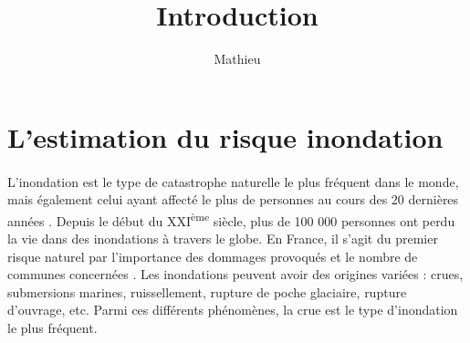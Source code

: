 \documentclass[11pt]{article}
\title{Introduction}
\author{Mathieu}
\begin{document}
\maketitle

\tableofcontents

\newpage

\section{L'estimation du risque inondation}

	\paragraph{} L'inondation est le type de catastrophe naturelle le plus fréquent dans le monde, mais également celui ayant affecté le plus de personnes au cours des 20 dernières années \citep{undrr_human_2020}. Depuis le début du XXI\textsuperscript{ème} siècle, plus de 100 000 personnes ont perdu la vie dans des inondations à travers le globe. En France, il s'agit du premier risque naturel par l'importance des dommages provoqués et le nombre de communes concernées \citep{medd_site_nodate}. Les inondations peuvent avoir des origines variées : crues, submersions marines, ruissellement, rupture de poche glaciaire, rupture d'ouvrage, etc. Parmi ces différents phénomènes, la crue est le type d'inondation le plus fréquent. 
	
\end{document}
